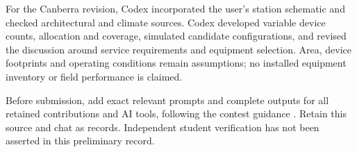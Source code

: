 \documentclass[12pt]{article}
\begin{document}
For the Canberra revision, Codex incorporated the user's station schematic and checked architectural and climate sources. Codex developed variable device counts, allocation and coverage, simulated candidate configurations, and revised the discussion around service requirements and equipment selection. Area, device footprints and operating conditions remain assumptions; no installed equipment inventory or field performance is claimed.

Before submission, add exact relevant prompts and complete outputs for all
retained contributions and AI tools, following the contest guidance \cite{aipolicy}.
Retain this source and chat as records. Independent student verification has
not been asserted in this preliminary record.
\end{document}

